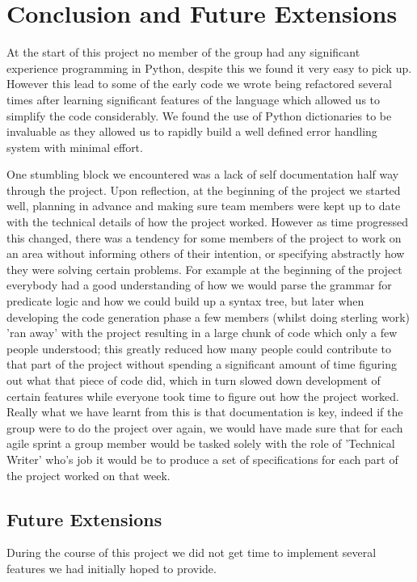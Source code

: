 \documentclass[a4paper, 11pt]{article}
\begin{document}
\section{Conclusion and Future Extensions}

  At the start of this project no member of the group had any significant
  experience programming in Python, despite this we found it very easy to pick
  up. However this lead to some of the early code we
  wrote being refactored several times after learning significant features
  of the language which allowed us to simplify the code considerably. We found 
  the use of Python dictionaries to be invaluable as they allowed us to 
  rapidly build a well defined error handling system with minimal effort.
  
  
  One stumbling block we encountered was a lack of self documentation half way
  through the project. Upon reflection, at the beginning of the project we 
  started well, planning in advance and making sure team members were kept up 
  to date with the technical details of how the project worked. However as time 
  progressed this changed, there was a tendency for some members of the project 
  to work on an area without informing others of their intention, or specifying 
  abstractly how they were solving certain problems. For example at the beginning 
  of the project everybody had a good understanding of how we would parse the 
  grammar for predicate logic and how we could build up a syntax tree, but later 
  when developing the  code generation phase a few members (whilst doing sterling 
  work) 'ran away' with the project resulting in a large chunk of code which only 
  a few people understood; this greatly reduced how many people could contribute 
  to that part of the project without spending a significant amount of time figuring 
  out what that piece of code did, which in turn slowed down development of certain
  features while everyone took time to figure out how the project worked.
  Really what we have learnt from this is that documentation is key, indeed if the
  group were to do the project over again, we would have made sure that for each
  agile sprint a group member would be tasked solely with the role of 'Technical
  Writer' who's job it would be to produce a set of specifications for each part
  of the project worked on that week. 


  \subsection{Future Extensions}
    During the course of this project we did not get time to implement several
    features we had initially hoped to provide. 
\end{document}

